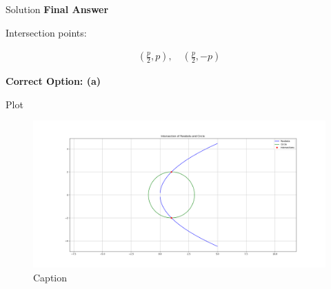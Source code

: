 \documentclass{beamer}
\begin{document}
\begin{frame}{Solution}
\textbf{Final Answer}

Intersection points:


\begin{align}
(\frac{p}{2}, p), \quad (\frac{p}{2}, -p)
\end{align}



\textbf{Correct Option: (a)}
\end{frame}

\begin{frame}{Plot}
    \begin{figure}
        \centering
        \includegraphics[width=0.8\linewidth]{./figs/Figure_1.png}
        \caption{Caption}
        \label{fig:placeholder}
    \end{figure}
\end{frame}
\end{document}
